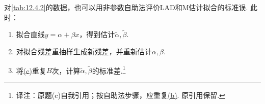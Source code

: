 \begin{exercise}\label{exercise:12.31}
对\autoref{tab:12.4.2}的数据，也可以用非参数自助法评价LAD和M估计拟合的标准误. 此时：
\begin{enumerate}[label=(\alph*)]
\item\label{item:12.31.a} 拟合直线$y=\alpha+\beta x$，得到估计$\tilde\alpha,\tilde\beta$.
\item\label{item:12.31.b} 对拟合残差重抽样生成新残差，并重新估计$\alpha,\beta$.
\item\label{item:12.31.c} 将\hyperref[item:12.31.c]{(c)}重复$B$次，计算$\tilde\alpha,\tilde\beta$的标准差.\footnote{译注：原题(c)自我引用；按自助法步骤，应重复\hyperref[item:12.31.b]{(b)}. 原引用保留.}
\end{enumerate}
\end{exercise}
